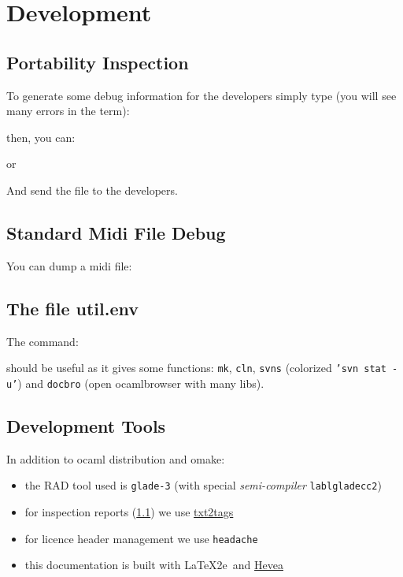 \section{Development}

\subsection{Portability Inspection}
\label{sec:inspect}

To generate some debug information for the developers simply type (you will see
many errors in the term):


then, you can:


or


And send the file  to the developers.

\subsection{Standard Midi File Debug}
You can dump a midi file:


\subsection{The file util.env}
The command:


should be useful as it gives some functions:
\texttt{mk}, \texttt{cln}, \texttt{svns} (colorized \texttt{'svn stat -u'}) and
\texttt{docbro} (open ocamlbrowser with many libs).

\subsection{Development Tools}

In addition to ocaml distribution and omake:

\begin{itemize}
  \item the RAD tool used is \texttt{glade-3} (with special
  \textit{semi-compiler} \texttt{lablgladecc2})
  \item for inspection reports (\ref{sec:inspect}) we use
  \href{http://txt2tags.sourceforge.net/}{txt2tags}
  \item for licence header management we use \texttt{headache}
  \item this documentation is built with \LaTeX2e\ and 
  \href{http://hevea.inria.fr/}{Hevea}
\end{itemize}

